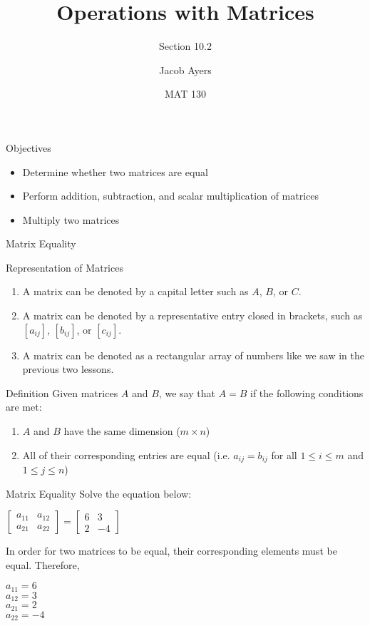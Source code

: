 \documentclass[t]{beamer}
\title[Abbr]{Operations with Matrices}
\subtitle{Section 10.2}
\author{Jacob Ayers}
\institute{Lesson \#26}
\date{MAT 130}
\newcommand{\fb}[1]{\left[{#1}\right]} %
\begin{document}
	
	\begin{frame}
		\titlepage
	\end{frame}
	
	\begin{frame}{Objectives}
		\begin{itemize}
			\item Determine whether two matrices are equal
			\item Perform addition, subtraction, and scalar multiplication of matrices
			\item Multiply two matrices
		\end{itemize}
	\end{frame}

	\begin{frame}{Matrix Equality}
		\begin{block}{Representation of Matrices}
			\begin{enumerate}[1)]
				\item A matrix can be denoted by a capital letter such as $A$, $B$, or $C$.
				\item A matrix can be denoted by a representative entry closed in brackets, such as $\fb{a_{ij}}$, $\fb{b_{ij}}$, or $\fb{c_{ij}}$.
				\item A matrix can be denoted as a rectangular array of numbers like we saw in the previous two lessons.
			\end{enumerate}
		\end{block} \pause
	
		\begin{block}{Definition}
			Given matrices $A$ and $B$, we say that $A = B$ if the following conditions are met: \begin{enumerate}[1)]
				\item $A$ and $B$ have the same dimension ($m\times n$)
				\item All of their corresponding entries are equal (i.e. $a_{ij} = b_{ij}$ for all $1\leq i\leq m$ and $1 \leq j \leq n$)
			\end{enumerate}
		\end{block}
	\end{frame}

	\begin{frame}{Matrix Equality}
		Solve the equation below:
		
		$\begin{bmatrix}
		a_{11} & a_{12} \\ a_{21} & a_{22}
		\end{bmatrix} = \begin{bmatrix}
		6 & 3 \\ 2 & -4
		\end{bmatrix}$ \pause \vspace{18pt}
		
		In order for two matrices to be equal, their corresponding elements must be equal. Therefore, \pause
		
		$a_{11} = 6$ \\ $a_{12} = 3$ \\ $a_{21} = 2$ \\ $a_{22} = -4$
	\end{frame}
\end{document}
